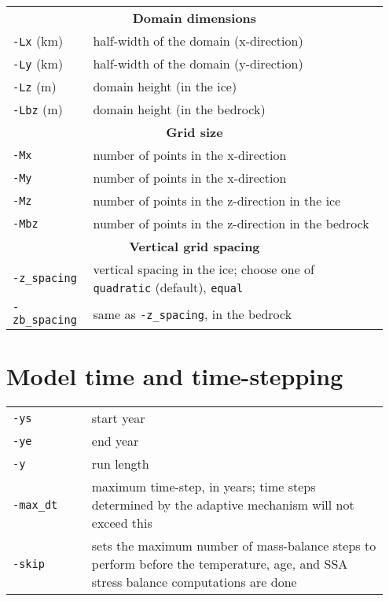 \documentclass[landscape]{article}
\newcommand{\tabletitle}[1]{\multicolumn{2}{c}{\textbf{#1}}}
\begin{document}
\begin{textblock}{15}
\begin{tabular}{@{}p{0.2\linewidth}p{0.75\linewidth}@{}}
\tabletitle{Domain dimensions} \\
 \texttt{-Lx} (km) & half-width of the domain \mbox{(x-direction)}\\
  \texttt{-Ly} (km) & half-width of the domain \mbox{(y-direction)}\\
  \texttt{-Lz} (m) & domain height (in the ice)\\
  \texttt{-Lbz} (m) & domain height (in the bedrock)\\
\tabletitle{Grid size} \\
 \texttt{-Mx} & number of points in the x-direction\\
  \texttt{-My} & number of points in the x-direction\\
  \texttt{-Mz} & number of points in the z-direction in the ice\\
  \texttt{-Mbz} & number of points in the z-direction in the bedrock\\
\tabletitle{Vertical grid spacing} \\
 \texttt{-z_spacing} & vertical spacing in the ice; choose one of \texttt{quadratic} (default), \texttt{equal}\\
  \texttt{-zb_spacing} & same as \texttt{-z_spacing}, in the bedrock\\
\end{tabular}

\section{Model time and time-stepping}
\label{sec:model-time} \label{sec:time-stepping}
\begin{tabular}{@{}p{0.2\linewidth}p{0.75\linewidth}@{}}
  \texttt{-ys} & start year \\
  \texttt{-ye} & end year \\
  \texttt{-y} & run length \\
  \texttt{-max_dt} & maximum time-step, in years; time steps determined by
  the adaptive mechanism will not exceed this\\
  \texttt{-skip} &  sets the maximum number of mass-balance steps to perform
  before the temperature, age, and SSA stress balance computations
  are done\\
\end{tabular}



\end{textblock}
\end{document}
